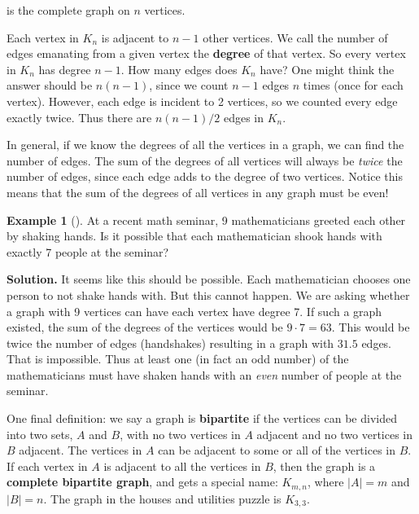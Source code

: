 \documentclass[10pt,]{book}
\newcommand{\terminology}[1]{\textbf{#1}}
\theoremstyle{plain}
\theoremstyle{definition}
\theoremstyle{definition}
\newtheorem{example}[theorem]{Example}
\theoremstyle{definition}
\numberwithin{equation}{chapter}
\begin{document}
 is the complete graph on \(n\) vertices.%
\par
\hypertarget{p-95}{}%
Each vertex in \(K_n\) is adjacent to \(n-1\) other vertices. We call the number of edges emanating from a given vertex the \terminology{degree} of that vertex. So every vertex in \(K_n\) has degree \(n-1\). How many edges does \(K_n\) have? One might think the answer should be \(n(n-1)\), since we count \(n-1\) edges \(n\) times (once for each vertex). However, each edge is incident to 2 vertices, so we counted every edge exactly twice. Thus there are \(n(n-1)/2\) edges in \(K_n\). %
\par
\hypertarget{p-96}{}%
In general, if we know the degrees of all the vertices in a graph, we can find the number of edges. The sum of the degrees of all vertices will always be \emph{twice} the number of edges, since each edge adds to the degree of two vertices. Notice this means that the sum of the degrees of all vertices in any graph must be even!%
\begin{example}[]\label{example-5}
\hypertarget{p-97}{}%
At a recent math seminar, 9 mathematicians greeted each other by shaking hands. Is it possible that each mathematician shook hands with exactly 7 people at the seminar?%
\par\smallskip%
\noindent\textbf{Solution.}\hypertarget{solution-8}{}\quad%
\hypertarget{p-98}{}%
It seems like this should be possible. Each mathematician chooses one person to not shake hands with. But this cannot happen. We are asking whether a graph with 9 vertices can have each vertex have degree 7. If such a graph existed, the sum of the degrees of the vertices would be \(9\cdot 7 = 63\). This would be twice the number of edges (handshakes) resulting in a graph with \(31.5\) edges. That is impossible. Thus at least one (in fact an odd number) of the mathematicians must have shaken hands with an \emph{even} number of people at the seminar.%
\end{example}
\hypertarget{p-99}{}%
One final definition: we say a graph is \terminology{bipartite} if the vertices can be divided into two sets, \(A\) and \(B\), with no two vertices in \(A\) adjacent and no two vertices in \(B\) adjacent. The vertices in \(A\) can be adjacent to some or all of the vertices in \(B\). If each vertex in \(A\) is adjacent to all the vertices in \(B\), then the graph is a \terminology{complete bipartite graph}, and gets a special name: \(K_{m,n}\), where \(|A| = m\) and \(|B| = n\). The graph in the houses and utilities puzzle is \(K_{3,3}\).%
\typeout{************************************************}
\typeout{************************************************}
\end{document}
